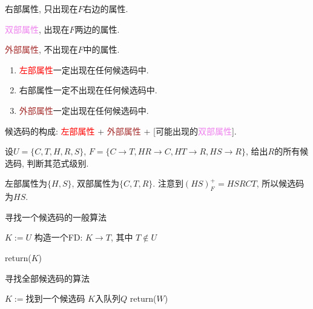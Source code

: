 \begin{definition}[右部属性]
  \textcolor{green!60!black}{右部属性}, 只出现在$F$右边的属性.
\end{definition}

\begin{definition}[双部属性]
  \textcolor{violet}{双部属性}, 出现在$F$两边的属性.
\end{definition}

\begin{definition}[外部属性]
  \textcolor{brown}{外部属性}, 不出现在$F$中的属性.
\end{definition}

\begin{enumerate}
    \item \textcolor{red}{左部属性}一定出现在任何候选码中.
    \item \textcolor{green!60!black}{右部属性}一定不出现在任何候选码中.
    \item \textcolor{brown}{外部属性}一定出现在任何候选码中.
\end{enumerate}

候选码的构成: \textcolor{red}{左部属性} + \textcolor{brown}{外部属性} + [可能出现的\textcolor{violet}{双部属性}].

\begin{example}
  设$U=\{C,T,H,R,S\}$, $F=\{C\to T,HR\to C,HT\to R,HS\to R\}$, 给出$R$的所有候选码, 判断其范式级别.
\end{example}

左部属性为$\{H,S\}$, 双部属性为$\{C,T,R\}$. 注意到$(HS)_F^+=HSRCT$, 所以候选码为$HS$.

\begin{algorithm}[H]
    
    \caption{寻找一个候选码的一般算法}
    
    $K := U$\;
    构造一个FD: $K \rightarrow T$, 其中 $T \notin U$\;
    
    return($K$)\;
\end{algorithm}

\begin{algorithm}[H]
    
    \caption{寻找全部候选码的算法}
    
    $K := $找到一个候选码\;
    $K$入队列$Q$\;
  return($W$)\;
\end{algorithm}

